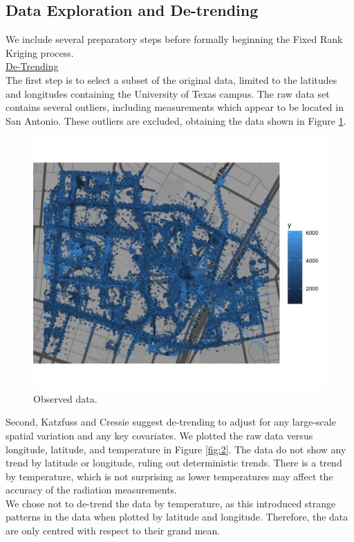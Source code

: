 \documentclass[11pt]{article}
\begin{document}
\subsection{Data Exploration and De-trending}
We include several preparatory steps before formally beginning the Fixed Rank Kriging process.\\

\underline{De-Trending}\\

The first step is to select a subset of the original data, limited to the latitudes and longitudes containing the University of Texas campus.  The raw data set contains several outliers, including measurements which appear to be located in San Antonio.  These outliers are excluded, obtaining the data shown in Figure \ref{fig:1}. \\

\begin{figure}[H]
\centering
\includegraphics[width=0.7\columnwidth]{Images/original_data_plot.jpg}
\caption{Observed data.}
\label{fig:1}
\end{figure}

Second, Katzfuss and Cressie suggest de-trending to adjust for any large-scale spatial variation and any key covariates.  We plotted the raw data versus longitude, latitude, and temperature in Figure \ref{fig:2}.  The data do not show any trend by latitude or longitude, ruling out deterministic trends.  There is a trend by temperature, which is not surprising as lower temperatures may affect the accuracy of the radiation measurements. \\

We chose not to de-trend the data by temperature, as this introduced strange patterns in the data when plotted by latitude and longitude. Therefore, the data are only centred with respect to their grand mean. \\
\end{document}

